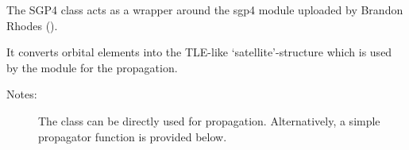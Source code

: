 \documentclass[letterpaper,10pt,english]{sphinxmanual}
\begin{document}
\begin{fulllineitems}
\label{\detokenize{modules/propagator_sgp4:propagator_sgp4.SGP4}}
The SGP4 class acts as a wrapper around the sgp4 module
uploaded by Brandon Rhodes ().

It converts orbital elements into the TLE-like ‘satellite’-structure which
is used by the module for the propagation.
\begin{description}
\item[{Notes:}] \leavevmode
The class can be directly used for propagation. Alternatively,
a simple propagator function is provided below.

\end{description}

\begin{fulllineitems}
\label{\detokenize{modules/propagator_sgp4:propagator_sgp4.SGP4.GM}}
\end{fulllineitems}


\begin{fulllineitems}
\label{\detokenize{modules/propagator_sgp4:propagator_sgp4.SGP4.MJD_0}}
\end{fulllineitems}


\begin{fulllineitems}
\label{\detokenize{modules/propagator_sgp4:propagator_sgp4.SGP4.Q0}}
\end{fulllineitems}


\begin{fulllineitems}
\label{\detokenize{modules/propagator_sgp4:propagator_sgp4.SGP4.RHO0}}
\end{fulllineitems}


\end{fulllineitems}
\end{document}
